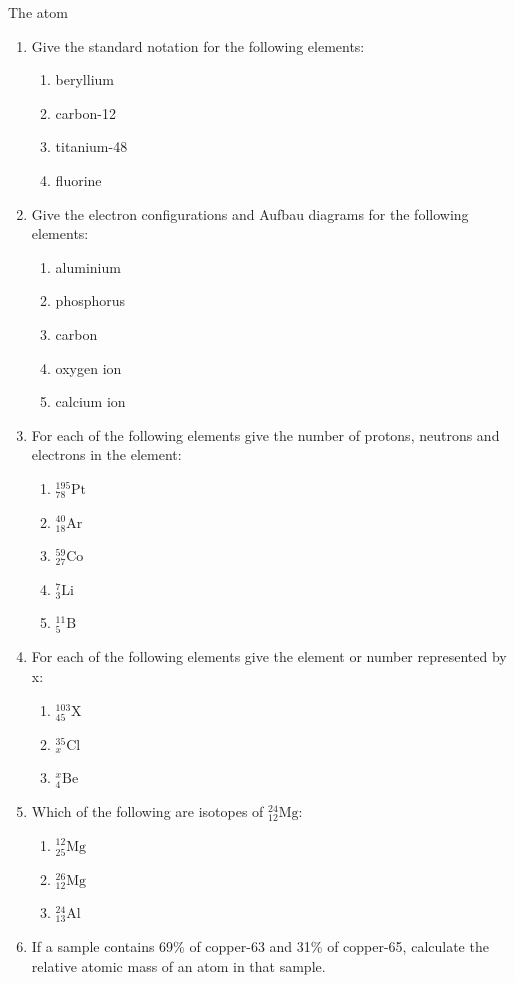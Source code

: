 \begin{eocexercises}{The atom}
\begin{enumerate}[noitemsep, label=\textbf{\arabic*}. ]
        \item Give the standard notation for the following elements:
\label{m38741*id8223}\begin{enumerate}[noitemsep, label=\textbf{\alph*}. ] 
            \item beryllium
\item carbon-12
\item titanium-48
\item fluorine
\end{enumerate}
\item Give the electron configurations and Aufbau diagrams for the following elements:\label{m38741*id7624}\begin{enumerate}[noitemsep, label=\textbf{\alph*}. ] 
            \item aluminium
\item phosphorus
\item carbon
\item oxygen ion
\item calcium ion
\end{enumerate}
\item For each of the following elements give the number of protons, neutrons and electrons in the element: \label{m38741*id74374}\begin{enumerate}[noitemsep, label=\textbf{\alph*}. ] 
            \item $_{78}^{195}\text{Pt}$
\item $_{18}^{40}\text{Ar}$
\item $_{27}^{59}\text{Co}$
\item $_{3}^{7}\text{Li}$
\item $_{5}^{11}\text{B}$
\end{enumerate}
\item For each of the following elements give the element or number represented by x: \label{m38741*id7434324}\begin{enumerate}[noitemsep, label=\textbf{\alph*}. ] 
            \item $_{45}^{103}\text{X}$
\item $_{x}^{35}\text{Cl}$
\item $_{4}^{x}\text{Be}$
\end{enumerate}
\item Which of the following are isotopes of $_{12}^{24}\text{Mg}$: \label{m38741*id743234}
\begin{enumerate}[noitemsep, label=\textbf{\alph*}. ] 
            \item $_{25}^{12}\text{Mg}$
\item $_{12}^{26}\text{Mg}$
\item $_{13}^{24}\text{Al}$
\end{enumerate}
\item If a sample contains 69\% of copper-63 and 31\% of copper-65, calculate the relative atomic mass of an atom in that sample.\newline


\end{enumerate}
\end{eocexercises}
